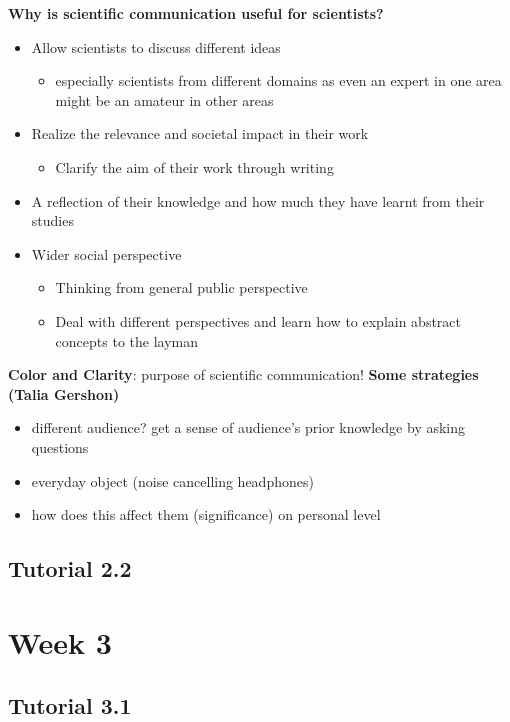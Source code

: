 \documentclass{article}
\begin{document}
\begin{multicols}{2}
\textbf{Why is scientific communication useful for scientists?}
\begin{itemize}
	\item Allow scientists to discuss different ideas
	\begin{itemize}
		\item especially scientists from different domains as even an expert in one area might be an amateur in other areas
	\end{itemize}
	\item Realize the relevance and societal impact in their work
	\begin{itemize}
		\item Clarify the aim of their work through writing
	\end{itemize}
	\item A reflection of their knowledge and how much they have learnt from their studies
	\item Wider social perspective
	\begin{itemize}
		\item Thinking from general public perspective
		\item Deal with different perspectives and learn how to explain abstract concepts to the layman\\
	\end{itemize}
\end{itemize}

\textbf{Color and Clarity}: purpose of scientific communication!
\textbf{Some strategies (Talia Gershon)}
\begin{itemize}
	\item different audience? get a sense of audience's prior knowledge by asking questions
	\item everyday object (noise cancelling headphones)
	\item how does this affect them (significance) on personal level
\end{itemize}

\subsection{Tutorial 2.2}

\section{Week 3}
\subsection{Tutorial 3.1}

\end{multicols}
\end{document}
